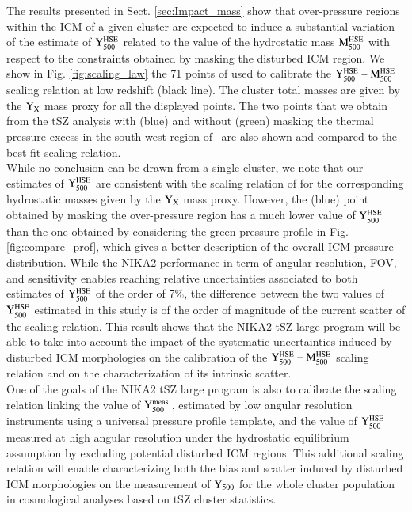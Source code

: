 \documentclass[traditabstract]{aa}
\begin{document}
\indent The results presented in Sect. \ref{sec:Impact_mass} show that over-pressure regions within the ICM of a given cluster are expected to induce a substantial variation of the estimate of $\rm{Y_{500}^{\rm{HSE}}}$ related to the value of the hydrostatic mass $\rm{M_{500}^{\rm{HSE}}}$ with respect to the constraints obtained by masking the disturbed ICM region. We show in Fig. \ref{fig:scaling_law} the 71 points of \cite{pla14} used to calibrate the $\rm{Y_{500}^{\rm{HSE}}}-\rm{M_{500}^{\rm{HSE}}}$ scaling relation at low redshift (black line). The cluster total masses are given by the $\rm{Y_X}$ mass proxy \citep[see \emph{e.g.} ][]{arn07} for all the displayed points. The two points that we obtain from the tSZ analysis with (blue) and without (green) masking the thermal pressure excess in the south-west region of \psz\ are also shown and compared to the best-fit scaling relation.\\ 
\indent While no conclusion can be drawn from a single cluster, we note that our estimates of $\rm{Y_{500}^{\rm{HSE}}}$ are consistent with the scaling relation of \cite{pla14} for the corresponding hydrostatic masses given by the $\rm{Y_X}$ mass proxy. However, the (blue) point obtained by masking the over-pressure region has a much lower value of $\rm{Y_{500}^{\rm{HSE}}}$ than the one obtained by considering the green pressure profile in Fig. \ref{fig:compare_prof}, which gives a better description of the overall ICM pressure distribution. While the NIKA2 performance in term of angular resolution, FOV, and sensitivity enables reaching relative uncertainties associated to both estimates of $\rm{Y_{500}^{\rm{HSE}}}$ of the order of 7\%, the difference between the two values of $\rm{Y_{500}^{\rm{HSE}}}$ estimated in this study is of the order of magnitude of the current scatter of the scaling relation. This result shows that the NIKA2 tSZ large program will be able to take into account the impact of the systematic uncertainties induced by disturbed ICM morphologies on the calibration of the $\rm{Y_{500}^{\rm{HSE}}}-\rm{M_{500}^{\rm{HSE}}}$ scaling relation and on the characterization of its intrinsic scatter.\\
\indent One of the goals of the NIKA2 tSZ large program is also to calibrate the scaling relation linking the value of $\rm{Y_{500}^{\rm{meas.}}}$, estimated by low angular resolution instruments using a universal pressure profile template, and the value of $\rm{Y_{500}^{\rm{HSE}}}$ measured at high angular resolution under the hydrostatic equilibrium assumption by excluding potential disturbed ICM regions. This additional scaling relation will enable characterizing both the bias and scatter induced by disturbed ICM morphologies on the measurement of $\rm{Y_{500}}$ for the whole cluster population in cosmological analyses based on tSZ cluster statistics.\\
\end{document}
